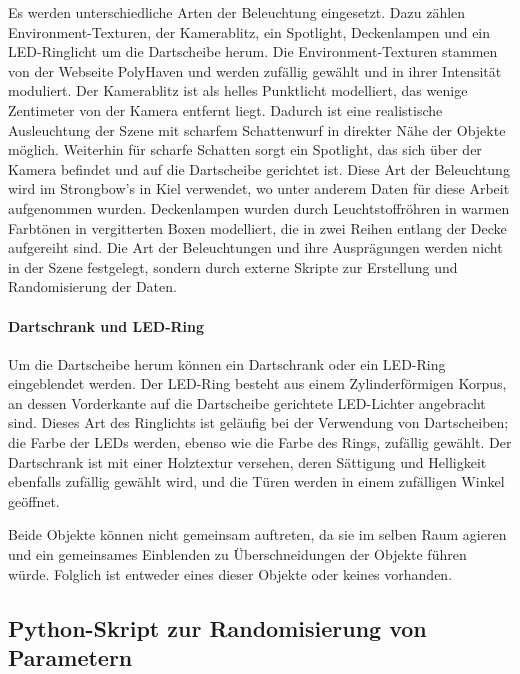 Es werden unterschiedliche Arten der Beleuchtung eingesetzt. Dazu zählen Environment-Texturen, der Kamerablitz, ein Spotlight, Deckenlampen und ein LED-Ringlicht um die Dartscheibe herum. Die Environment-Texturen stammen von der Webseite PolyHaven\cite{polyhaven} und werden zufällig gewählt und in ihrer Intensität moduliert. Der Kamerablitz ist als helles Punktlicht modelliert, das wenige Zentimeter von der Kamera entfernt liegt. Dadurch ist eine realistische Ausleuchtung der Szene mit scharfem Schattenwurf in direkter Nähe der Objekte möglich. Weiterhin für scharfe Schatten sorgt ein Spotlight, das sich über der Kamera befindet und auf die Dartscheibe gerichtet ist. Diese Art der Beleuchtung wird im Strongbow's in Kiel verwendet, wo unter anderem Daten für diese Arbeit aufgenommen wurden. Deckenlampen wurden durch Leuchtstoffröhren in warmen Farbtönen in vergitterten Boxen modelliert, die in zwei Reihen entlang der Decke aufgereiht sind. Die Art der Beleuchtungen und ihre Ausprägungen werden nicht in der Szene festgelegt, sondern durch externe Skripte zur Erstellung und Randomisierung der Daten.

\paragraph{Dartschrank und LED-Ring}
\label{sec:impl:daten:blender:nebenobjekte:cabinet}

Um die Dartscheibe herum können ein Dartschrank oder ein LED-Ring eingeblendet werden. Der LED-Ring besteht aus einem Zylinderförmigen Korpus, an dessen Vorderkante auf die Dartscheibe gerichtete LED-Lichter angebracht sind. Dieses Art des Ringlichts ist geläufig bei der Verwendung von Dartscheiben; die Farbe der LEDs werden, ebenso wie die Farbe des Rings, zufällig gewählt. Der Dartschrank ist mit einer Holztextur versehen, deren Sättigung und Helligkeit ebenfalls zufällig gewählt wird, und die Türen werden in einem zufälligen Winkel geöffnet.

Beide Objekte können nicht gemeinsam auftreten, da sie im selben Raum agieren und ein gemeinsames Einblenden zu Überschneidungen der Objekte führen würde. Folglich ist entweder eines dieser Objekte oder keines vorhanden.

\subsection{Python-Skript zur Randomisierung von Parametern}
\label{sec:impl:daten:python}

